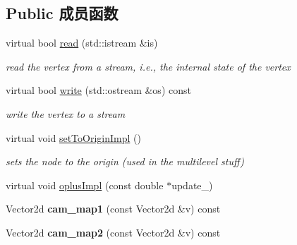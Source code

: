 \subsection*{Public 成员函数}
\begin{DoxyCompactItemize}
\item 
\hypertarget{classg2o_1_1VertexSim3Expmap_a16b4ef216ad1c4709a6fc6aa452d8e61}{virtual bool \hyperlink{classg2o_1_1VertexSim3Expmap_a16b4ef216ad1c4709a6fc6aa452d8e61}{read} (std\-::istream \&is)}\label{classg2o_1_1VertexSim3Expmap_a16b4ef216ad1c4709a6fc6aa452d8e61}

\begin{DoxyCompactList}\small\item\em read the vertex from a stream, i.\-e., the internal state of the vertex \end{DoxyCompactList}\item 
\hypertarget{classg2o_1_1VertexSim3Expmap_afdc6079061312466de17b7493e4c491a}{virtual bool \hyperlink{classg2o_1_1VertexSim3Expmap_afdc6079061312466de17b7493e4c491a}{write} (std\-::ostream \&os) const }\label{classg2o_1_1VertexSim3Expmap_afdc6079061312466de17b7493e4c491a}

\begin{DoxyCompactList}\small\item\em write the vertex to a stream \end{DoxyCompactList}\item 
\hypertarget{classg2o_1_1VertexSim3Expmap_ab076d5964ab55f95251a75bcf341ce05}{virtual void \hyperlink{classg2o_1_1VertexSim3Expmap_ab076d5964ab55f95251a75bcf341ce05}{set\-To\-Origin\-Impl} ()}\label{classg2o_1_1VertexSim3Expmap_ab076d5964ab55f95251a75bcf341ce05}

\begin{DoxyCompactList}\small\item\em sets the node to the origin (used in the multilevel stuff) \end{DoxyCompactList}\item 
virtual void \hyperlink{classg2o_1_1VertexSim3Expmap_abef7e4d10825caa129984f69251508c2}{oplus\-Impl} (const double $\ast$update\-\_\-)
\item 
\hypertarget{classg2o_1_1VertexSim3Expmap_a6ca0c90f25fcde9ab38881b100bab6bc}{Vector2d {\bfseries cam\-\_\-map1} (const Vector2d \&v) const }\label{classg2o_1_1VertexSim3Expmap_a6ca0c90f25fcde9ab38881b100bab6bc}

\item 
\hypertarget{classg2o_1_1VertexSim3Expmap_a4841c2bbe7b883be30f74b50e078b42e}{Vector2d {\bfseries cam\-\_\-map2} (const Vector2d \&v) const }\label{classg2o_1_1VertexSim3Expmap_a4841c2bbe7b883be30f74b50e078b42e}

\end{DoxyCompactItemize}
